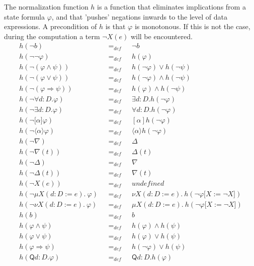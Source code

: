 \documentclass{article}
\begin{document}
The normalization function $h$ is a function that eliminates implications
from a state formula $\varphi $, and that 'pushes' negations inwards to the
level of data expressions. A precondition of $h$ is that $\varphi $ is
monotonous. If this is not the case, during the computation a term $\lnot
X(e)$ will be encountered.%
\begin{equation*}
\begin{array}{lll}
h(\lnot b) & =_{def} & \lnot b \\
h(\lnot \lnot \varphi ) & =_{def} & h(\varphi ) \\
h(\lnot (\varphi \wedge \psi )) & =_{def} & h(\lnot \varphi )\vee h(\lnot
\psi ) \\
h(\lnot (\varphi \vee \psi )) & =_{def} & h(\lnot \varphi )\wedge h(\lnot
\psi ) \\
h(\lnot (\varphi \Rightarrow \psi )) & =_{def} & h(\varphi )\wedge h(\lnot
\psi ) \\
h(\lnot \forall d{{:}D}.\varphi ) & =_{def} & \exists d{{:}D}.h(\lnot
\varphi ) \\
h(\lnot \exists d{{:}D}.\varphi ) & =_{def} & \forall d{{:}D}.h(\lnot
\varphi ) \\
h(\lnot \lbrack \alpha ]\varphi ) & =_{def} & [\alpha ]h(\lnot \varphi ) \\
h(\lnot \langle \alpha \rangle \varphi ) & =_{def} & \langle \alpha \rangle
h(\lnot \varphi ) \\
h(\lnot \nabla ) & =_{def} & \Delta \\
h(\lnot \nabla (t)) & =_{def} & \Delta (t) \\
h(\lnot \Delta ) & =_{def} & \nabla \\
h(\lnot \Delta (t)) & =_{def} & \nabla (t) \\
h(\lnot X(e)) & =_{def} & undefined \\
h(\lnot \mu X(d{:}D:=e).~\varphi )~~~ & =_{def}~~~ & \nu X(d{:}%
D:=e).~h(\lnot \varphi \lbrack X:=\lnot X]) \\
h(\lnot \nu X(d{:}D:=e).~\varphi )~~~ & =_{def}~~~ & \mu X(d{:}%
D:=e).~h(\lnot \varphi \lbrack X:=\lnot X]) \\
h(b) & =_{def} & b \\
h(\varphi \wedge \psi ) & =_{def} & h(\varphi )\wedge h(\psi ) \\
h(\varphi \vee \psi ) & =_{def} & h(\varphi )\vee h(\psi ) \\
h(\varphi \Rightarrow \psi ) & =_{def} & h(\lnot \varphi )\vee h(\psi ) \\
h(\mathsf{Q}d{{:}D}.\varphi ) & =_{def} & \mathsf{Q}d{{:}D}.h(\varphi ) \\

\end{array}
\end{equation*}
\end{document}
